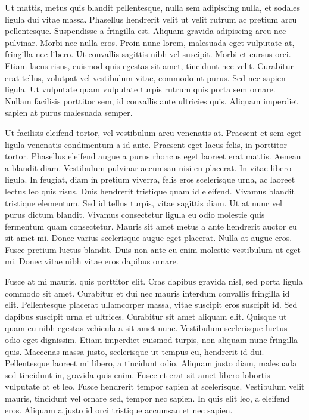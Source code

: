 Ut mattis, metus quis blandit pellentesque, nulla sem adipiscing nulla, et sodales ligula dui vitae massa.
Phasellus hendrerit velit ut velit rutrum ac pretium arcu pellentesque.
Suspendisse a fringilla est.
Aliquam gravida adipiscing arcu nec pulvinar.
Morbi nec nulla eros.
Proin nunc lorem, malesuada eget vulputate at, fringilla nec libero.
Ut convallis sagittis nibh vel suscipit.
Morbi et cursus orci.
Etiam lacus risus, euismod quis egestas sit amet, tincidunt nec velit.
Curabitur erat tellus, volutpat vel vestibulum vitae, commodo ut purus.
Sed nec sapien ligula.
Ut vulputate quam vulputate turpis rutrum quis porta sem ornare.
Nullam facilisis porttitor sem, id convallis ante ultricies quis.
Aliquam imperdiet sapien at purus malesuada semper.

Ut facilisis eleifend tortor, vel vestibulum arcu venenatis at.
Praesent et sem eget ligula venenatis condimentum a id ante.
Praesent eget lacus felis, in porttitor tortor.
Phasellus eleifend augue a purus rhoncus eget laoreet erat mattis.
Aenean a blandit diam.
Vestibulum pulvinar accumsan nisi eu placerat.
In vitae libero ligula.
In feugiat, diam in pretium viverra, felis eros scelerisque urna, ac laoreet lectus leo quis risus.
Duis hendrerit tristique quam id eleifend.
Vivamus blandit tristique elementum.
Sed id tellus turpis, vitae sagittis diam.
Ut at nunc vel purus dictum blandit.
Vivamus consectetur ligula eu odio molestie quis fermentum quam consectetur.
Mauris sit amet metus a ante hendrerit auctor eu sit amet mi.
Donec varius scelerisque augue eget placerat.
Nulla at augue eros.
Fusce pretium luctus blandit.
Duis non ante eu enim molestie vestibulum ut eget mi.
Donec vitae nibh vitae eros dapibus ornare.

Fusce at mi mauris, quis porttitor elit.
Cras dapibus gravida nisl, sed porta ligula commodo sit amet.
Curabitur et dui nec mauris interdum convallis fringilla id elit.
Pellentesque placerat ullamcorper massa, vitae suscipit eros suscipit id.
Sed dapibus suscipit urna et ultrices.
Curabitur sit amet aliquam elit.
Quisque ut quam eu nibh egestas vehicula a sit amet nunc.
Vestibulum scelerisque luctus odio eget dignissim.
Etiam imperdiet euismod turpis, non aliquam nunc fringilla quis.
Maecenas massa justo, scelerisque ut tempus eu, hendrerit id dui.
Pellentesque laoreet mi libero, a tincidunt odio.
Aliquam justo diam, malesuada sed tincidunt in, gravida quis enim.
Fusce et erat sit amet libero lobortis vulputate at et leo.
Fusce hendrerit tempor sapien at scelerisque.
Vestibulum velit mauris, tincidunt vel ornare sed, tempor nec sapien.
In quis elit leo, a eleifend eros.
Aliquam a justo id orci tristique accumsan et nec sapien.
